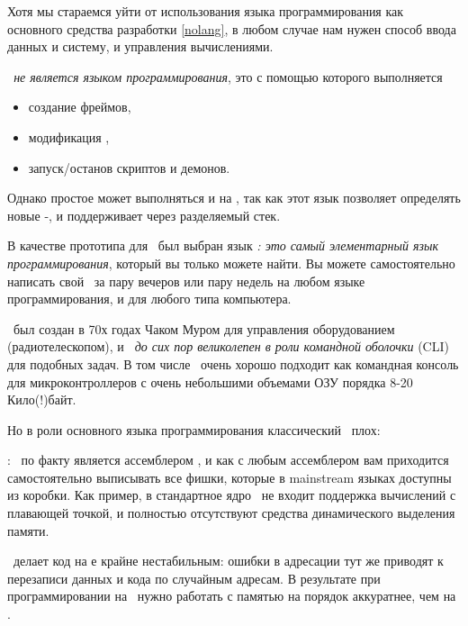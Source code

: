 \clearpage
{}\secdown

Хотя мы стараемся уйти от использования языка программирования как основного
средства разработки \ref{nolang}, в любом случае нам нужен способ ввода данных и
систему, и управления вычислениями.

\emph{\metal\ не является языком
программирования}, это  с помощью которого выполняется
\begin{itemize}[nosep]
  \item 
создание фреймов, 
  \item 
модификация , 
  \item 
запуск/останов скриптов и демонов. 
\end{itemize}

\medskip\noindent
Однако простое  может выполняться и на
\metal, так как этот язык позволяет определять новые \F-, и
поддерживает  через разделяемый стек.

\clearpage
В качестве прототипа для \metal\ был выбран язык \emph{\F: это самый
элементарный язык программирования}, который вы только можете найти. Вы можете
самостоятельно написать свой \F\ за пару вечеров или пару недель на любом языке
программирования, и для любого типа компьютера.

\F\ был создан в 70х годах Чаком Муром для управления оборудованием
(радиотелескопом), и \emph{\F\ до сих пор великолепен в роли командной оболочки}
(CLI) для подобных задач. В том числе \F\ очень хорошо подходит как командная
консоль для микроконтроллеров с очень небольшими объемами ОЗУ порядка 8-20
Кило(!)байт.

\noindent
Но в роли основного языка программирования классический \F\ плох:
\begin{description}[nosep]
\item[низкоуровневая модель ВМ языка]: \F\ по факту является ассемблером
, и как с любым ассемблером вам приходится
самостоятельно выписывать все фишки, которые в mainstream языках доступны из
коробки. Как пример, в стандартное ядро \F\ не входит поддержка вычислений с
плавающей точкой, и полностью отсутствуют средства динамического выделения
памяти.
\item[прямой доступ к памяти по адресам]\ делает код на \F е крайне
нестабильным: ошибки в адресации тут же приводят к перезаписи данных и кода по
случайным адресам. В результате при программировании на \F\ нужно работать с
памятью на порядок аккуратнее, чем на \emc.
\end{description}

